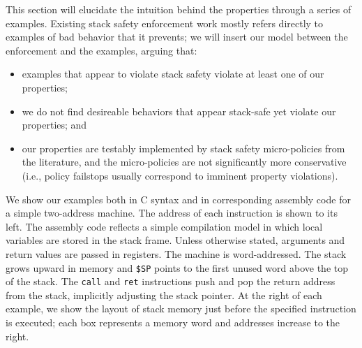 \documentclass[acmsmall,review,anonymous]{acmart}\settopmatter{printfolios=true,printccs=false,printacmref=false}
\newcommand*{\rsp}{\textsc{sp}}
\begin{document}
This section will elucidate the intuition behind the properties through a series
of examples. Existing stack safety enforcement work mostly refers directly to examples
of bad behavior that it prevents; we will insert our model between the enforcement and
the examples, arguing that:

\begin{itemize}
\item examples that appear to violate stack safety violate at least one of our properties;
\item we do not find desireable behaviors that appear stack-safe yet violate our properties; and
\item our properties are testably implemented by stack safety micro-policies from the
  literature, and the micro-policies are not significantly more conservative
  (i.e., policy failstops usually correspond to imminent property violations).
\end{itemize}

We show our examples both in C syntax and in corresponding assembly code for a
simple two-address machine. The address of each instruction is shown to its left.
The assembly code reflects a simple compilation model in which  
local variables are stored in the stack frame.
Unless otherwise stated, arguments and return values are passed in registers.
The machine is word-addressed. The stack grows upward in
memory and {\tt \$SP} points to the first unused word above the top of the stack.
The {\tt call} and {\tt ret} instructions push and pop the return address from the stack,
implicitly adjusting the stack pointer.
At the right of each example, we show the layout of stack memory just before
the specified instruction is executed; each box represents a memory word and
addresses increase to the right.  


\end{document}
